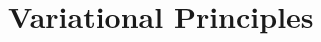 \documentclass[main.tex]{subfiles}
\begin{document}
	\chapter{Variational Principles}
\end{document}
